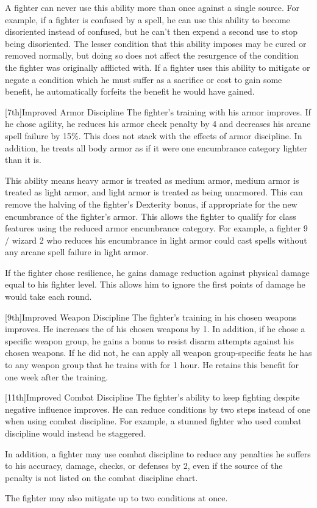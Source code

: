 \par A fighter can never use this ability more than once against a single source.
For example, if a fighter is confused by a  spell, he can use this ability to become disoriented instead of confused, but he can't then expend a second use to stop being disoriented.
The lesser condition that this ability imposes may be cured or removed normally, but doing so does not affect the resurgence of the condition the fighter was originally afflicted with.
If a fighter uses this ability to mitigate or negate a condition which he must suffer as a sacrifice or cost to gain some benefit, he automatically forfeits the benefit he would have gained.

[7th]{Improved Armor Discipline}
The fighter's training with his armor improves.
If he chose agility, he reduces his armor check penalty by 4 and decreases his arcane spell failure by 15\%.
This does not stack with the effects of armor discipline.
In addition, he treats all body armor as if it were one encumbrance category lighter than it is.
\par This ability means heavy armor is treated as medium armor, medium armor is treated as light armor, and light armor is treated as being unarmored.
This can remove the halving of the fighter's Dexterity bonus, if appropriate for the new encumbrance of the fighter's armor.
This allows the fighter to qualify for class features using the reduced armor encumbrance category.
For example, a fighter 9 / wizard 2 who reduces his encumbrance in light armor could cast spells without any arcane spell failure in light armor.

If the fighter chose resilience, he gains damage reduction against physical damage equal to his fighter level. This allows him to ignore the first points of damage he would take each round.

[9th]{Improved Weapon Discipline}
The fighter's training in his chosen weapons improves.
He increases the  of his chosen weapons by 1.
In addition, if he chose a specific weapon group, he gains a  bonus to resist disarm attempts against his chosen weapons.
If he did not, he can apply all weapon group-specific feats he has to any weapon group that he trains with for 1 hour.
He retains this benefit for one week after the training.

[11th]{Improved Combat Discipline}
The fighter's ability to keep fighting despite negative influence improves.
He can reduce conditions by two steps instead of one when using combat discipline.
For example, a stunned fighter who used combat discipline would instead be staggered.
\par In addition, a fighter may use combat discipline to reduce any penalties he suffers to his accuracy, damage, checks, or defenses by 2, even if the source of the penalty is not listed on the combat discipline chart.
\par The fighter may also mitigate up to two conditions at once.

